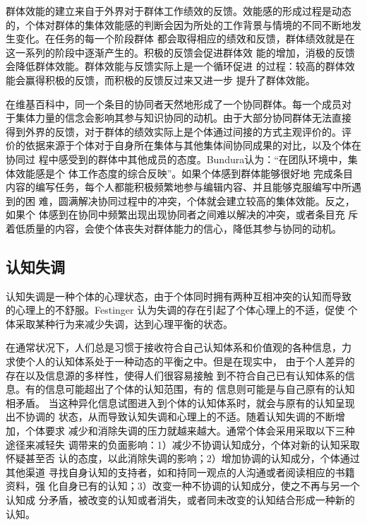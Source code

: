 群体效能的建立来自于外界对于群体工作绩效的反馈。效能感的形成过程是动态
的，个体对群体的集体效能感的判断会因为所处的工作背景与情境的不同不断地发生变化。在任务的每一个阶段群体
都会取得相应的绩效和反馈，群体绩效就是在这一系列的阶段中逐渐产生的。积极的反馈会促进群体效
能的增加，消极的反馈会降低群体效能。群体效能与反馈实际上是一个循环促进
的过程：较高的群体效能会赢得积极的反馈，而积极的反馈反过来又进一步
提升了群体效能\cite{gist1987self}。

在维基百科中，同一个条目的协同者天然地形成了一个协同群体。每一个成员对
于集体力量的信念会影响其参与知识协同的动机。由于大部分协同群体无法直接
得到外界的反馈，对于群体的绩效实际上是个体通过间接的方式主观评价的。评
价的依据来源于个体对于自身所在集体与其他集体间协同成果的对比，以及个体在协同过
程中感受到的群体中其他成员的态度。Bundura认为：“在团队环境中，集体效能感是个
体工作态度的综合反映”\cite{bundura1977slt}。如果个体感到群体能够很好地
完成条目内容的编写任务，每个人都能积极频繁地参与编辑内容、并且能够克服编写中所遇到的困
难，圆满解决协同过程中的冲突，个体就会建立较高的集体效能。反之，如果个
体感到在协同中频繁出现出现协同者之间难以解决的冲突，或者条目充
斥着低质量的内容，会使个体丧失对群体能力的信心，降低其参与协同的动机。

\subsection{认知失调}
\label{sec:cognitive-dissonance}
认知失调是一种个体的心理状态，由于个体同时拥有两种互相冲突的认知而导致
的心理上的不舒服。Festinger 认为失调的存在引起了个体心理上的不适，促使
个体采取某种行为来减少失调，达到心理平衡的状态\cite{festinger1957theory}。

在通常状况下，人们总是习惯于接收符合自己认知体系和价值观的各种信息，力
求使个人的认知体系处于一种动态的平衡之中。但是在现实中，
由于个人差异的存在以及信息源的多样性，使得人们很容易接触
到不符合自己已有认知体系的信息。有的信息可能超出了个体的认知范围，有的
信息则可能是与自己原有的认知相矛盾。
当这种异化信息试图进入到个体的认知体系时，就会与原有的认知呈现出不协调的
状态，从而导致认知失调和心理上的不适。随着认知失调的不断增加，个体要求
减少和消除失调的压力就越来越大。通常个体会采用采取以下三种途径来减轻失
调带来的负面影响：1）减少不协调认知成分，个体对新的认知采取怀疑甚至否
认的态度，以此消除失调的影响；2）增加协调的认知成分，个体通过其他渠道
寻找自身认知的支持者，如和持同一观点的人沟通或者阅读相应的书籍资料，强
化自身已有的认知；3）改变一种不协调的认知成分，使之不再与另一个认知成
分矛盾，被改变的认知或者消失，或者同未改变的认知结合形成一种新的认知。 

